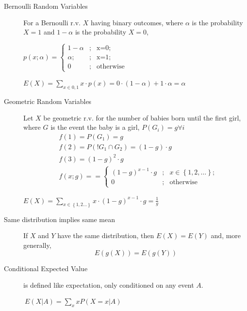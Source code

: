 \documentclass[10pt,landscape]{article}
\begin{document}
\begin{multicols}{3}
\begin{description}
\item[Bernoulli Random Variables] For a Bernoulli r.v. $X$ having binary outcomes, where $\alpha$ is the probability $X=1$ and $1-\alpha$ is the probability $X=0$,
\begin{center}
$p(x;\alpha) = \left\{\begin{array}{lcl} 1-\alpha &; & \mbox{x=0}; \\ \alpha; &; & \mbox{x=1}; \\ 0 & ; & \mbox{otherwise} \end{array} \right.$
\end{center}
\begin{center}$E(X) = \sum\limits_{x \in {0, 1}}x\cdot p(x) = 0 \cdot (1 - \alpha) + 1 \cdot \alpha = \alpha$\end{center}

\item[Geometric Random Variables] Let $X$ be geometric r.v. for the number of babies born until the first girl, where $G$ is the event the baby is a girl, $P(G_i) = g \forall i$
\begin{align*}
& f(1)=P(G_1)=g \\
& f(2)=P(!G_1 \cap G_2)=(1-g) \cdot g \\
& f(3)=(1-g)^2 \cdot g \\
& f(x;g)== \left\{\begin{array}{lcl} (1-g)^{x-1} \cdot g &; & x \in \left \{1, 2, \dots \right \}; \\ 0 & ; & \mbox{otherwise} \end{array} \right.
\end{align*}

\begin{center}
$E(X) = \sum\limits_{x \in \left \{ {1, 2 \dots } \right \}}x \cdot (1-g)^{x-1} \cdot g = \frac{1}{g}$
\end{center}

\item[Same distribution implies same mean] If $X$ and $Y$ have the same distribution, then $E(X)=E(Y)$ and, more generally, 
$$E(g(X)) = E(g(Y))$$

\item[Conditional Expected Value] is defined like expectation, only conditioned on any event $A$. \begin{center}
$\ E(X | A) = \sum\limits_{x}xP(X=x | A)$
\end{center}


\end{description}
\end{multicols}
\end{document}
